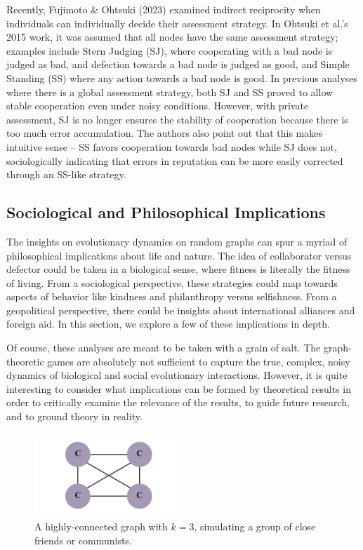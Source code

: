 \documentclass[11pt]{article}
\begin{document}
Recently, Fujimoto \& Ohtsuki (2023) examined indirect reciprocity when individuals can individually decide their assessment strategy. In Ohtsuki et al.'s 2015 work, it was assumed that all nodes have the same assessment strategy; examples include Stern Judging (SJ), where cooperating with a bad node is judged as bad, and defection towards a bad node is judged as good, and Simple Standing (SS) where any action towards a bad node is good. In previous analyses where there is a global assessment strategy, both SJ and SS proved to allow stable cooperation even under noisy conditions. However, with private assessment, SJ is no longer ensures the stability of cooperation because there is too much error accumulation. The authors also point out that this makes intuitive sense -- SS favors cooperation towards bad nodes while SJ does not, sociologically indicating that errors in reputation can be more easily corrected through an SS-like strategy. 

\subsection{Sociological and Philosophical Implications}
The insights on evolutionary dynamics on random graphs can spur a myriad of philosophical implications about life and nature. The idea of collaborator versus defector could be taken in a biological sense, where fitness is literally the fitness of living. From a sociological perspective, these strategies could map towards aspects of behavior like kindness and philanthropy versus selfishness. From a geopolitical perspective, there could be insights about international alliances and foreign aid. In this section, we explore a few of these implications in depth. 

Of course, these analyses are meant to be taken with a grain of salt. The graph-theoretic games are absolutely not sufficient to capture the true, complex, noisy dynamics of biological and social evolutionary interactions. However, it is quite interesting to consider what implications can be formed by theoretical results in order to critically examine the relevance of the results, to guide future research, and to ground theory in reality. 

\begin{figure}[htbp]
    \centering    \includegraphics[width=0.5\textwidth]{figures/friends.png}
    \caption{A highly-connected graph with $k = 3$, simulating a group of close friends or communists.}
    \label{fig:friends}
\end{figure}
\end{document}
